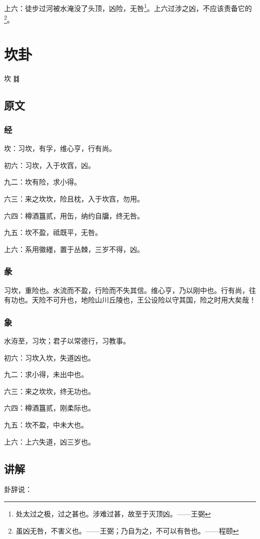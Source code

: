 \documentclass[12pt,oneside]{book}
\begin{document}
上六：徒步过河被水淹没了头顶，凶险，无咎\footnote{处太过之极，过之甚也。涉难过甚，故至于灭顶凶。——王弼}。上六过涉之凶，不应该责备它的\footnote{虽凶无咎，不害义也。——王弼；乃自为之，不可以有咎也。——程颐}。


\chapter{坎卦}
坎 {\Large ䷜}

\section{原文}

\subsection{经}
坎：习坎，有孚，维心亨，行有尚。

初六：习坎，入于坎窞，凶。

九二：坎有险，求小得。

六三：来之坎坎，险且枕，入于坎窞，勿用。

六四：樽酒簋贰，用缶，纳约自牖，终无咎。

九五：坎不盈，祗既平，无咎。

上六：系用徽纆，置于丛棘，三岁不得，凶。

\subsection{彖}
习坎，重险也。水流而不盈，行险而不失其信。维心亨，乃以刚中也。行有尚，往有功也。天险不可升也，地险山川丘陵也，王公设险以守其国，险之时用大矣哉！

\subsection{象}
水洊至，习坎；君子以常德行，习教事。

初六：习坎入坎，失道凶也。

九二：求小得，未出中也。

六三：来之坎坎，终无功也。

六四：樽酒簋贰，刚柔际也。

九五：坎不盈，中未大也。

上六：上六失道，凶三岁也。

\section{讲解}
卦辞说：
\end{document}
